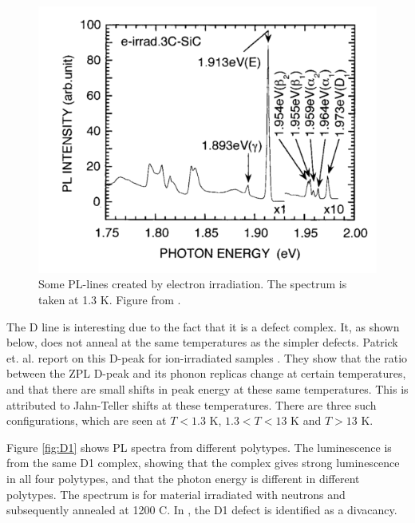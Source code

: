\documentclass[a4paper,12pt]{article}
\begin{document}
\begin{figure}[H]
\begin{center}
\includegraphics[scale=0.7]{pl1.png}
\caption{Some PL-lines created by electron irradiation. The spectrum is taken at 1.3 K. Figure from \cite{Itoh1997}.
\label{fig:pl1}}
\end{center}
\end{figure}

The D line is interesting due to the fact that it is a defect complex. It, as shown below, does not anneal at the same temperatures as the simpler defects. Patrick et. al. report on this D-peak for ion-irradiated samples \cite{L.Patrick1971}. They show that the ratio between the ZPL D-peak and its phonon replicas change at certain temperatures, and that there are small shifts in peak energy at these same temperatures. This is attributed to Jahn-Teller shifts at these temperatures. There are three such configurations, which are seen at $T<1.3$ K, $1.3 < T < 13$ K and $T>13$ K.  

Figure \ref{fig:D1} shows PL spectra from different polytypes. The luminescence is from the same D1 complex, showing that the complex gives strong luminescence in all four polytypes, and that the photon energy is different in different polytypes. The spectrum is for material irradiated with neutrons and subsequently annealed at 1200 C. In \cite{Kalinina2007}, the D1 defect is identified as a divacancy. 
\end{document}
